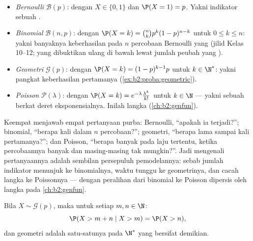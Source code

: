 \begin{example}\label{ex:b2:randomvar:laws}
\leavevmode
\begin{itemize}
\item \emph{Bernoulli} $\mathcal{B}(p)$: dengan $X \in \{0, 1\}$ dan $\P(X =
1) = p$. Yakni indikator sebuah .
\item \emph{Binomial} $\mathcal{B}(n, p)$: dengan $\P(X = k) =
\binom nk p^k(1-p)^{n-k}$ untuk $0 \leq k \leq n$: yakni banyaknya keberhasilan
pada $n$ percobaan Bernoulli yang  (jilid Kelas 10--12; yang dibuktikan ulang
di bawah lewat jumlah peubah yang ).
\item \emph{Geometri} $\mathcal{G}(p)$: dengan $\P(X = k) =
(1-p)^{k-1}p$ untuk $k \in \N^*$: yakni pangkat keberhasilan pertamanya
(\cref{ex:b2:proba:geometric}).
\item \emph{Poisson} $\mathcal{P}(\lambda)$: dengan $\P(X = k) =
e^{-\lambda}\frac{\lambda^k}{k!}$ untuk $k \in \N$ --- yakni sebuah  berkat deret eksponensialnya. Inilah   langka
(\cref{ch:b2:genfun}).
\end{itemize}
\end{example}

\begin{remark}
Keempat  menjawab empat pertanyaan purba: Bernoulli,
``apakah ia terjadi?''; binomial, ``berapa kali dalam $n$
percobaan?''; geometri, ``berapa lama sampai kali pertamanya?'';
dan Poisson, ``berapa banyak  pada laju tertentu, ketika percobaannya
banyak dan masing-masing tak mungkin?''. Jadi mengenali pertanyaannya
adalah sembilan persepuluh pemodelannya: sebab jumlah indikator menunjuk ke
binomialnya, waktu tunggu ke geometrinya, dan cacah 
langka ke Poissonnya --- dengan peralihan dari binomial ke
Poisson dipersis oleh   langka pada
\cref{ch:b2:genfun}.
\end{remark}

\begin{proposition}\label{prop:b2:randomvar:memoryless}
Bila $X \sim \mathcal{G}(p)$, maka untuk setiap $m, n \in \N$:
\[
\P(X > m + n \mid X > m) = \P(X > n) ,
\]
dan  geometri adalah satu-satunya  pada $\N^*$ yang bersifat
demikian.
\end{proposition}

